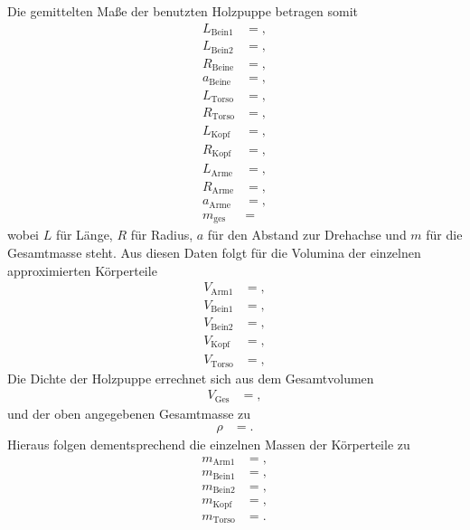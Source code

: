 Die gemittelten Maße der benutzten Holzpuppe betragen somit
\begin{align*}
  L_{\text{Bein1}}  &= , \\
  L_{\text{Bein2}}  &= , \\
  R_{\text{Beine}}   &= , \\
  a_{\text{Beine}}   &= , \\
  L_{\text{Torso}}   &= , \\
  R_{\text{Torso}}   &= , \\
  L_{\text{Kopf}}    &= , \\
  R_{\text{Kopf}}    &= , \\
  L_{\text{Arme}}    &= , \\
  R_{\text{Arme}}    &= , \\
  a_{\text{Arme}}    &= , \\
  m_{\text{ges}}     &= 
\end{align*}
wobei $L$ für Länge, $R$ für Radius, $a$ für den Abstand zur Drehachse und $m$ für die Gesamtmasse steht.
Aus diesen Daten folgt für die Volumina der einzelnen approximierten Körperteile
\begin{align*}
  V_{\text{Arm1}}  &= , \\
  V_{\text{Bein1}}  &= , \\
  V_{\text{Bein2}}  &= , \\
  V_{\text{Kopf}}  &= , \\
  V_{\text{Torso}}  &= ,
\end{align*}
Die Dichte der Holzpuppe errechnet sich aus dem Gesamtvolumen
\begin{align*}
  V_\text{Ges} &= ,
\end{align*}
und der oben angegebenen Gesamtmasse zu
\begin{align*}
  \rho &= .
\end{align*}
Hieraus folgen dementsprechend die einzelnen Massen der Körperteile zu
\begin{align*}
  m_{\text{Arm1}}  &= , \\
  m_{\text{Bein1}}  &= , \\
  m_{\text{Bein2}}  &= , \\
  m_{\text{Kopf}}  &= , \\
  m_{\text{Torso}}  &= .
\end{align*}
